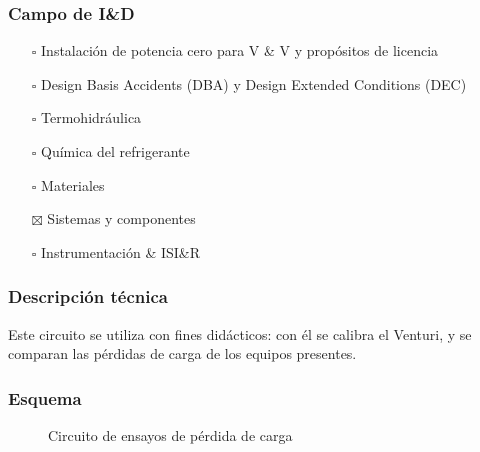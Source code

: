 \documentclass{article}
\begin{document}
\subsubsection*{Campo de I\&D}
\begin{itemize}
\item[$\square$] Instalación de potencia cero para V \& V y propósitos de licencia
\item[$\square$] Design Basis Accidents (DBA) y Design Extended Conditions (DEC)
\item[$\square$] Termohidráulica
\item[$\square$] Química del refrigerante
\item[$\square$] Materiales
\item[$\boxtimes$] Sistemas y componentes
\item[$\square$] Instrumentación \& ISI\&R
\end{itemize}
\subsubsection*{Descripción técnica}
Este circuito se utiliza con fines didácticos: con él se calibra el Venturi, y se comparan las pérdidas de carga de los equipos presentes.
\subsubsection*{Esquema}
\begin{figure}[H]
\begin{center}
\end{center}
\caption{Circuito de ensayos de pérdida de carga}
\end{figure}
\end{document}
